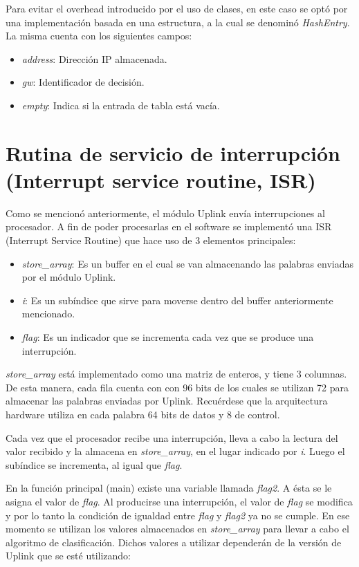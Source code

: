 Para evitar el overhead introducido por el uso de clases, en este caso se optó por una implementación basada en una estructura, a la cual se denominó \textit{HashEntry}. La misma cuenta con los siguientes campos:

\begin{itemize}
	\item \textit{address}: Dirección IP almacenada.
	\item \textit{gw}: Identificador de decisión.
	\item \textit{empty}: Indica si la entrada de tabla está vacía.
\end{itemize}

\section{Rutina de servicio de interrupción (Interrupt service routine, ISR)}

Como se mencionó anteriormente, el módulo Uplink envía interrupciones al procesador. A fin de poder procesarlas en el software se implementó una ISR (Interrupt Service Routine) que hace uso de 3 elementos principales:

\begin{itemize}
	\item \textit{store\_array}: Es un buffer en el cual se van almacenando las palabras enviadas por el módulo Uplink.
	\item \textit{i}: Es un subíndice que sirve para moverse dentro del buffer anteriormente mencionado.
	\item \textit{flag}: Es un indicador que se incrementa cada vez que se produce una interrupción.
\end{itemize}

\textit{store\_array} está implementado como una matriz de enteros, y tiene 3 columnas. De esta manera, cada fila cuenta con con 96 bits de los cuales se utilizan 72 para almacenar las palabras enviadas por Uplink. Recuérdese que la arquitectura hardware utiliza en cada palabra 64 bits de datos y 8 de control.

Cada vez que el procesador recibe una interrupción, lleva a cabo la lectura del valor recibido y la almacena en \textit{store\_array}, en el lugar indicado por \textit{i}. Luego el subíndice se incrementa, al igual que \textit{flag}.

En la función principal (main) existe una variable llamada \textit{flag2}. A ésta se le asigna el valor de \textit{flag}. Al producirse una interrupción, el valor de \textit{flag} se modifica y por lo tanto la condición de igualdad entre \textit{flag} y \textit{flag2} ya no se cumple. En ese momento se utilizan los valores almacenados en \textit{store\_array} para llevar a cabo el algoritmo de clasificación. Dichos valores a utilizar dependerán de la versión de Uplink que se esté utilizando:

